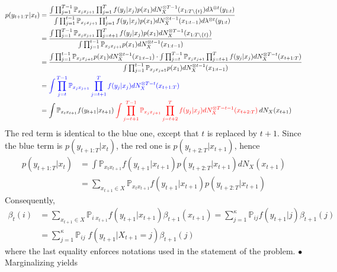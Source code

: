 \documentclass[a4paper,11pt, hidelinks]{article}
\begin{document}
\begin{enumerate}[label=(\alph*)]
	$$\begin{aligned}
		p(y_{t+1:T}|x_t) &= \frac{\int \prod_{j=1}^{T-1}\mathbb P_{x_{j} x_{j+1}} \prod_{j=1}^{T}f(y_j|x_j)p(x_1) dN_X^{\otimes T-1}(x_{1:T\setminus \{t\}}) d\lambda^{\otimes t}(y_{1:t})}{\int \prod_{j=1}^{t-1}\mathbb P_{x_{j} x_{j+1}} \prod_{j=1}^{t}f(y_j|x_j)p(x_1) dN_X^{\otimes t-1}(x_{1:t-1}) d\lambda^{\otimes t}(y_{1:t})}\\
		&= \frac{\int \prod_{j=1}^{T-1}\mathbb P_{x_{j} x_{j+1}} \prod_{j=t+1}^{T}f(y_j|x_j)p(x_1) dN_X^{\otimes T-1}(x_{1:T\setminus \{t\}}) }{\int \prod_{j=1}^{t-1}\mathbb P_{x_{j} x_{j+1}}p(x_1) dN_X^{\otimes t-1}(x_{1:t-1})}\\
		&= \frac{\int \prod_{j=1}^{t-1}\mathbb P_{x_{j} x_{j+1}}p(x_1) dN_X^{\otimes t-1}(x_{1:t-1}) \cdot \int \prod_{j=t}^{T-1}\mathbb P_{x_{j} x_{j+1}} \prod_{j=t+1}^{T}f(y_j|x_j) dN_X^{\otimes T-t}(x_{t+1:T}) }{\int \prod_{j=1}^{t-1}\mathbb P_{x_{j} x_{j+1}} p(x_1)dN_X^{\otimes t-1}(x_{1:t-1})}\\
		&= \mathbin{\textcolor{blue}{\int \prod_{j=t}^{T-1}\mathbb P_{x_{j} x_{j+1}} \prod_{j=t+1}^{T}f(y_j|x_j) dN_X^{\otimes T-t}(x_{t+1:T})}} \\
		&= \int \mathbb P_{x_t x_{t+1}}f(y_{t+1}|x_{t+1}) \mathbin{\textcolor{red}{\int \prod_{j=t+1}^{T-1}\mathbb P_{x_{j} x_{j+1}} \prod_{j=t+2}^{T}f(y_j|x_j) dN_X^{\otimes T-t-1}(x_{t+2:T})}} dN_X(x_{t+1})
	\end{aligned} $$
	The red term is identical to the blue one, except that $t$ is replaced by $t+1$. Since the blue term is $p(y_{t+1:T}|x_t)$, the red one is $p(y_{t+2:T}|x_{t+1})$, hence 
	$$\begin{aligned}
	p(y_{t+1:T}|x_t) &= \int \mathbb P_{x_t x_{t+1}}f(y_{t+1}|x_{t+1}) p(y_{t+2:T}|x_{t+1}) dN_X(x_{t+1}) \\
	&= \sum_{x_{t+1}\in X} \mathbb P_{x_t x_{t+1}}f(y_{t+1}|x_{t+1}) p(y_{t+2:T}|x_{t+1})
	\end{aligned}
	$$
	Consequently, $$\begin{aligned}
	\beta_t(i) &= \sum_{x_{t+1}\in X} \mathbb P_{i\;x_{t+1}}f(y_{t+1}|x_{t+1}) \beta_{t+1}(x_{t+1})
	= \sum_{j=1}^{\kappa} \mathbb P_{ij}f(y_{t+1}|j) \beta_{t+1}(j)\\
	&= \sum_{j=1}^{\kappa} \mathbb P_{ij} \;f(y_{t+1}|X_{t+1} = j) \beta_{t+1}(j)
	\end{aligned}
	$$
	where the last equality enforces notations used in the statement of the problem.
	\newline
	\newline
	$\bullet$ Marginalizing yields $$\begin{aligned}

\end{aligned}$$
\end{enumerate}
\end{document}
